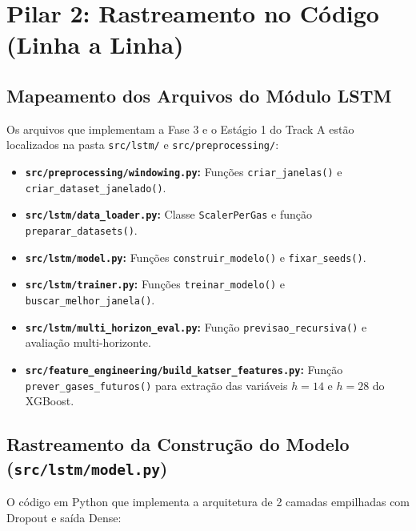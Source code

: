\documentclass[11pt,a4paper]{article}
\begin{document}
\vspace{0.4cm}
\section{Pilar 2: Rastreamento no Código (Linha a Linha)}

\subsection{Mapeamento dos Arquivos do Módulo LSTM}
Os arquivos que implementam a Fase 3 e o Estágio 1 do Track A estão localizados na pasta \texttt{src/lstm/} e \texttt{src/preprocessing/}:
\begin{itemize}
  \item \textbf{\texttt{src/preprocessing/windowing.py}:} Funções \texttt{criar\_janelas()} e \texttt{criar\_dataset\_janelado()}.
  \item \textbf{\texttt{src/lstm/data\_loader.py}:} Classe \texttt{ScalerPerGas} e função \texttt{preparar\_datasets()}.
  \item \textbf{\texttt{src/lstm/model.py}:} Funções \texttt{construir\_modelo()} e \texttt{fixar\_seeds()}.
  \item \textbf{\texttt{src/lstm/trainer.py}:} Funções \texttt{treinar\_modelo()} e \texttt{buscar\_melhor\_janela()}.
  \item \textbf{\texttt{src/lstm/multi\_horizon\_eval.py}:} Função \texttt{previsao\_recursiva()} e avaliação multi-horizonte.
  \item \textbf{\texttt{src/feature\_engineering/build\_katser\_features.py}:} Função \texttt{prever\_gases\_futuros()} para extração das variáveis $h=14$ e $h=28$ do XGBoost.
\end{itemize}

\subsection{Rastreamento da Construção do Modelo (\texttt{src/lstm/model.py})}
O código em Python que implementa a arquitetura de 2 camadas empilhadas com Dropout e saída Dense:
\end{document}
